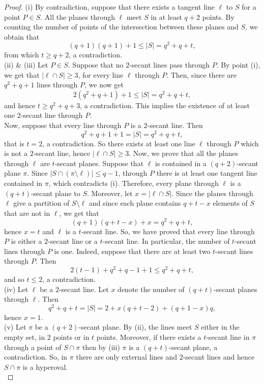 \documentclass[11pt]{amsart}
\begin{document}
\begin{proof}
(i) By contradiction, suppose that there exists a tangent line $\ell$ to $S$ for a point $P \in S$. All the planes through $\ell$ meet $S$ in at least $q+2$ points. By counting the number of points of the intersection between these planes and $S$, we obtain that
\[
(q+1)(q+1)+1 \leq \lvert S \rvert =q^2+q+t,
\]
from which $t\geq q+2$, a contradiction. \\
(ii) \& (iii) Let $P \in S$. Suppose that no $2$-secant lines pass through $P$. By point (i), we get that $\lvert \ell \cap S \rvert \geq 3$, for every line $\ell$ through $P$. Then, since there are $q^2+q+1$ lines through $P$, we now get
\[
2(q^2+q+1)+1 \leq \lvert S \rvert=q^2+q+t,
\]
and hence $t \geq q^2+q+3$, a contradiction. This implies the existence of at least one $2$-secant line through $P$.\\
Now, suppose that every line through $P$ is a $2$-secant line. Then
\[
q^2+q+1+1= \lvert S \rvert =q^2+q+t,
\]
that is $t=2$, a contradiction. So there exists at least one line $\ell$ through $P$ which is not a $2$-secant line, hence $\lvert \ell \cap S \rvert \geq 3$. 
Now, we prove that all the planes through $\ell$ are $t$-secant planes. 
Suppose that $\ell$ is contained in a $(q+2)$-secant plane $\pi$.
Since $ \lvert S \cap (\pi \setminus \ell) \rvert \leq q-1$, through $P$ there is at least one tangent line contained in $\pi$, which contradicts (i). 
Therefore, every plane through $\ell$ is a $(q+t)$-secant plane to $S$.
Moreover, let $x = \lvert \ell \cap S \rvert$. Since the planes through $\ell$ give a partition of $S \setminus \ell$ and since each plane contains $q+t-x$ elements of $S$ that are not in $\ell$, we get that
\[
(q+1)(q+t-x)+x=q^2+q+t,
\]
hence $x=t$ and $\ell$ is a $t$-secant line. 
So, we have proved that every line through $P$ is either a $2$-secant line or a $t$-secant line.
In particular, the number of $t$-secant lines through $P$ is one. 
Indeed, suppose that there are at least two $t$-secant lines through $P$. Then 
\[
2(t-1)+q^2+q-1+1 \leq q^2+q+t,
\]
and so $t \leq 2$, a contradiction. \\
(iv) Let $\ell$ be a $2$-secant line.
Let $x$ denote the number of $(q+t)$-secant planes through $\ell$.
Then
\[
 q^2 + q + t = |S| = 2 + x (q+t-2) + (q+1-x) q,
\]
hence $x=1$. \\
(v) Let $\pi$ be a $(q+2)$-secant plane. By (ii), the lines meet $S$ either in the empty set, in $2$ points or in $t$ points.
Moreover, if there exists a $t$-secant line in $\pi$ through a point of $S \cap \pi$ then by (iii) $\pi$ is a $(q+t)$-secant plane, a contradiction. So, in $\pi$ there are only external lines and $2$-secant lines and hence $S \cap \pi$ is a hyperoval. \\

\end{proof}
\end{document}
